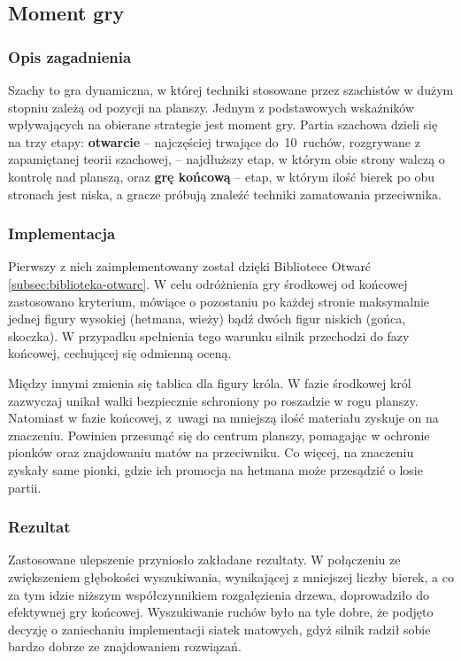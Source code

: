 \subsection{Moment gry}
\label{subsec:moment-gry}

\subsubsection{Opis zagadnienia}
Szachy to gra dynamiczna, w której techniki stosowane przez szachistów w dużym stopniu zależą od pozycji na planszy.
Jednym z podstawowych wskaźników wpływających na obierane strategie jest moment gry.
Partia szachowa dzieli się na trzy etapy: \textbf{otwarcie} – najczęściej trwające do~10~ruchów, rozgrywane z zapamiętanej teorii szachowej,  – najdłuższy etap, w którym obie strony walczą o kontrolę nad planszą, oraz \textbf{grę końcową} – etap, w którym ilość bierek po obu stronach jest niska, a gracze próbują znaleźć techniki zamatowania przeciwnika.

\subsubsection{Implementacja}
Pierwszy z nich zaimplementowany został dzięki Bibliotece Otwarć \ref{subsec:biblioteka-otwarc}.
W celu odróżnienia gry środkowej od końcowej zastosowano kryterium, mówiące o pozostaniu po każdej stronie maksymalnie jednej figury wysokiej (hetmana, wieży) bądź dwóch figur niskich (gońca, skoczka).
W przypadku spełnienia tego warunku silnik przechodzi do fazy końcowej, cechującej się odmienną oceną.

Między innymi zmienia się tablica dla figury króla.
W fazie środkowej król zazwyczaj unikał walki bezpiecznie schroniony po roszadzie w rogu planszy.
Natomiast w fazie końcowej, z~uwagi na mniejszą ilość materiału zyskuje on na znaczeniu.
Powinien przesunąć się do centrum planszy, pomagając w ochronie pionków oraz znajdowaniu matów na przeciwniku.
Co więcej, na znaczeniu zyskały same pionki, gdzie ich promocja na hetmana może przesądzić o losie partii.

\subsubsection{Rezultat}
Zastosowane ulepszenie przyniosło zakładane rezultaty.
W połączeniu ze zwiększeniem głębokości wyszukiwania, wynikającej z mniejszej liczby bierek, a co za tym idzie niższym współczynnikiem rozgałęzienia drzewa, doprowadziło do efektywnej gry końcowej.
Wyszukiwanie ruchów było na tyle dobre, że podjęto decyzję o zaniechaniu implementacji siatek matowych, gdyż silnik radził sobie bardzo dobrze ze znajdowaniem rozwiązań.